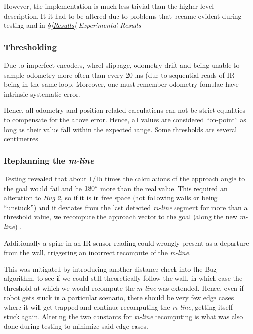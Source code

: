 \documentclass[11pt, a4paper]{article}
\begin{document}
However, the implementation is much less trivial than the higher level description. It it had 
to be altered due to problems that became evident during testing and in \textit{\S\ref{Results} Experimental Results}



\subsubsection{Thresholding}

Due to imperfect encoders, wheel slippage, odometry drift and being unable to sample odometry 
more often than every $20$ ms\cite{khepera_manual} (due to sequential 
reads of IR being in the same loop. Moreover, one must remember odometry fomulae have intrinsic 
systematic error.

Hence, all odometry and position-related calculations can not be strict equalities to compensate 
for the above error. Hence, all values are considered ``on-point'' as long as their value
fall within the expected range. Some thresholds are several centimetres.



\subsubsection{Replanning the \textit{m-line}}


Testing revealed that about $1/15$ times the calculations of the approach angle to the goal would 
fail and be $180\degree$ more than the real value. This required an alteration to \textit{Bug 2}, 
so if it is in free space (not following walls or being ``unstuck''\cite{task1_report}) and it 
deviates from the last detected \textit{m-line} segment for more than a threshold value, we 
recompute the approach vector to the goal (along the new \textit{m-line}) .

Additionally a spike in an IR sensor reading could wrongly present as a departure from the wall,
triggering an incorrect recompute of the \textit{m-line}.

This was mitigated by introducing another distance check into the Bug algorithm, to see if
we could still theoretically follow the wall, in which case the threshold at which we would 
recompute the \textit{m-line} was extended. Hence, even if robot gets stuck in a particular 
scenario, there should be very few edge cases where it will get trapped and continue recomputing
 the \textit{m-line}, getting itself stuck again. Altering the two constants for \textit{m-line}
 recomputing is what was also done during testing to minimize said edge cases.
\end{document}
